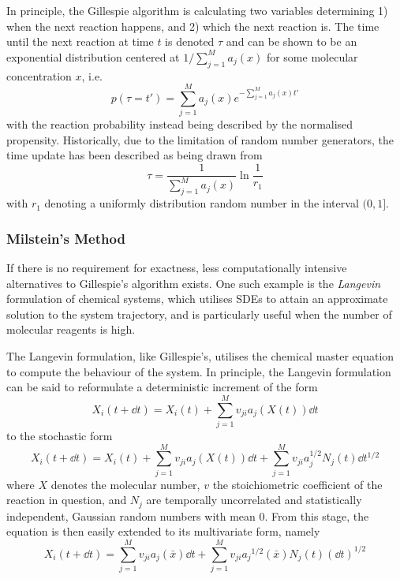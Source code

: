 In principle, the Gillespie algorithm is calculating two variables determining
1) when the next reaction happens, and 2) which the next reaction is.
The time until the next reaction at time $t$ is denoted $\tau$ and can be shown
to be an exponential distribution centered  
at $1 / \sum_{j=1}^{M}a_j(x)$ for some molecular concentration $x$, i.e.
\begin{equation}
  p(\tau = t') = \sum_{j=1}^M a_j(x)e^{-\sum_{j=1}^M a_j(x)t'}
  \label{eq:gill:time}
\end{equation}
with the reaction probability instead being described by the normalised
propensity. Historically, due to the limitation of random number generators, the
time update has been described as being drawn from 
\begin{equation} 
  \displaystyle
  \tau = \dfrac{1}{\sum_{j=1}^M a_j(x)} \ln\dfrac{1}{r_1}
  \label{eq:gill_time_update}
\end{equation}
with $r_1$ denoting a uniformly distribution random number in the interval
$(0,1]$.

\subsubsection{Milstein's Method}
\label{sec:milstein}
If there is no requirement for exactness, less computationally intensive
alternatives to Gillespie's algorithm exists. One such example is the
\textit{Langevin} formulation of chemical systems, which utilises SDEs to
attain an approximate solution to the system trajectory, and is particularly
useful when the number of molecular reagents is high. 

The Langevin formulation, like Gillespie's, utilises the chemical master
equation to compute the behaviour of the system. In principle, the Langevin
formulation can be said to reformulate a deterministic increment of the form
\begin{equation}
  X_i(t + \dd{t}) = X_{i}(t) + \sum_{j=1}^M
  v_{ji}a_j(X(t))\dd{t}
  \label{eq:deterministic}
\end{equation}
to the stochastic form
\begin{equation}
  X_i(t + \dd{t}) = X_{i}(t) + \sum_{j=1}^M
  v_{ji}a_j(X(t))\dd{t} + \sum_{j=1}^M
  v_{ji}a_j^{1/2}N_j(t)\dd{t}^{1/2}
  \label{eq:stoch}
\end{equation}
where $X$ denotes the molecular number, $v$ the stoichiometric coefficient of the
reaction in question, and $N_j$ are temporally uncorrelated and statistically
independent, Gaussian random numbers with mean 0. From this stage, the equation
is then easily extended to its multivariate form, namely
\begin{equation}
  X_i(t + \dd{t}) = \sum_{j=1}^Mv_{ji}a_j(\bar x) \dd{t} +
  \sum_{j=1}^M v_{ji}{a_j}^{1/2}(\bar x) N_j(t) \left( \dd t \right)^{1/2}
  \label{eq:stoch_multi}
\end{equation}

